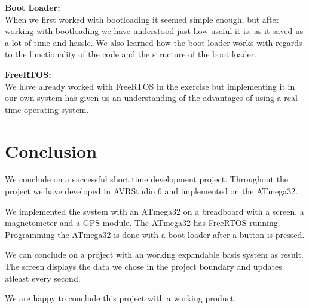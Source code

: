\textbf{Boot Loader:}\\
When we first worked with bootloading it seemed simple enough, but after working with bootloading we have understood just how useful it is, as it saved us a lot of time and hassle. We also learned how the boot loader works with regards to the functionality of the code and the structure of the boot loader.

\textbf{FreeRTOS:}\\
We have already worked with FreeRTOS in the exercise but implementing it in our own system has given us an understanding of the advantages of using a real time operating system. 


\chapter{Conclusion}
We conclude on a successful short time development project. Throughout the project we have developed in AVRStudio 6 and implemented on the ATmega32. 

We implemented the system with an ATmega32 on a breadboard with a screen, a magnetometer and a GPS module. The ATmega32 has FreeRTOS running. Programming the ATmega32 is done with a boot loader after a button is pressed.

We can conclude on a project with an working expandable basis system as result. The screen displays the data we chose in the project boundary and updates atleast every second. 

We are happy to conclude this project with a working product.

